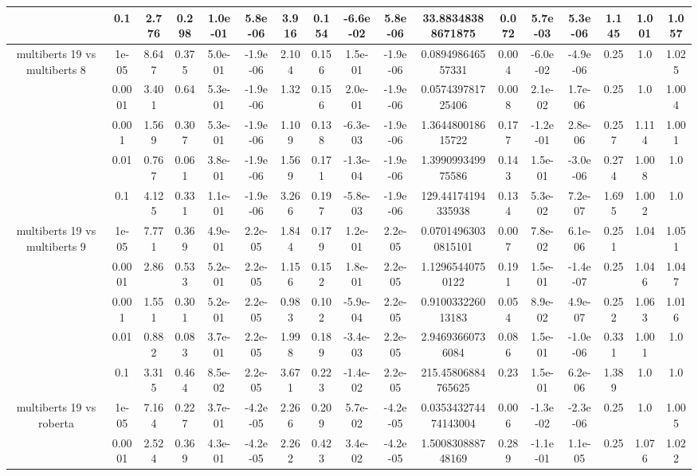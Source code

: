 \begin{tabular}{|c|c|c|c|c|c|c|c|c|c|c|c|c|c|c|c|c|}
 & 0.1 & 2.776 & 0.298 & 1.0e-01 & 5.8e-06 & 3.916 & 0.154 & -6.6e-02 & 5.8e-06 & 33.88348388671875 & 0.072 & 5.7e-03 & 5.3e-06 & 1.145 & 1.001 & 1.057 \\
\hline
\multirow{5}{*}{multiberts 19 vs multiberts 8} & 1e-05 & 8.647 & 0.375 & 5.0e-01 & -1.9e-06 & 2.104 & 0.156 & 1.5e-01 & -1.9e-06 & 0.089498646557331 & 0.004 & -6.0e-02 & -4.9e-06 & 0.25 & 1.0 & 1.025 \\
 & 0.0001 & 3.401 & 0.64 & 5.3e-01 & -1.9e-06 & 1.32 & 0.156 & 2.0e-01 & -1.9e-06 & 0.057439781725406 & 0.008 & 2.1e-02 & 1.7e-06 & 0.25 & 1.0 & 1.004 \\
 & 0.001 & 1.569 & 0.307 & 5.3e-01 & -1.9e-06 & 1.109 & 0.138 & -6.3e-03 & -1.9e-06 & 1.364480018615722 & 0.177 & -1.2e-01 & 2.8e-06 & 0.257 & 1.114 & 1.001 \\
 & 0.01 & 0.767 & 0.061 & 3.8e-01 & -1.9e-06 & 1.569 & 0.171 & -1.3e-04 & -1.9e-06 & 1.399099349975586 & 0.143 & 1.5e-01 & -3.0e-06 & 0.274 & 1.008 & 1.0 \\
 & 0.1 & 4.125 & 0.331 & 1.1e-01 & -1.9e-06 & 3.266 & 0.197 & -5.8e-03 & -1.9e-06 & 129.44174194335938 & 0.134 & 5.3e-02 & 7.2e-07 & 1.695 & 1.002 & 1.0 \\
\hline
\multirow{5}{*}{multiberts 19 vs multiberts 9} & 1e-05 & 7.771 & 0.369 & 4.9e-01 & 2.2e-05 & 1.844 & 0.179 & 1.2e-01 & 2.2e-05 & 0.07014963030815101 & 0.007 & 7.8e-02 & 6.1e-06 & 0.251 & 1.04 & 1.051 \\
 & 0.0001 & 2.86 & 0.533 & 5.2e-01 & 2.2e-05 & 1.156 & 0.152 & 1.8e-01 & 2.2e-05 & 1.12965440750122 & 0.191 & 1.5e-01 & -1.4e-07 & 0.25 & 1.046 & 1.047 \\
 & 0.001 & 1.551 & 0.301 & 5.2e-01 & 2.2e-05 & 0.983 & 0.102 & -5.9e-04 & 2.2e-05 & 0.910033226013183 & 0.054 & 8.9e-02 & 4.9e-07 & 0.252 & 1.063 & 1.016 \\
 & 0.01 & 0.882 & 0.083 & 3.7e-01 & 2.2e-05 & 1.998 & 0.189 & -3.4e-03 & 2.2e-05 & 2.94693660736084 & 0.086 & 1.5e-01 & -1.0e-06 & 0.331 & 1.001 & 1.0 \\
 & 0.1 & 3.315 & 0.464 & 8.5e-02 & 2.2e-05 & 3.671 & 0.223 & -1.4e-02 & 2.2e-05 & 215.45806884765625 & 0.23 & 1.5e-01 & 6.2e-06 & 1.389 & 1.0 & 1.0 \\
\hline
\multirow{5}{*}{multiberts 19 vs roberta } & 1e-05 & 7.164 & 0.227 & 3.7e-01 & -4.2e-05 & 2.266 & 0.209 & 5.7e-02 & -4.2e-05 & 0.035343274474143004 & 0.006 & -1.3e-02 & -2.3e-06 & 0.25 & 1.0 & 1.005 \\
 & 0.0001 & 2.524 & 0.369 & 4.3e-01 & -4.2e-05 & 2.262 & 0.423 & 3.4e-02 & -4.2e-05 & 1.500830888748169 & 0.289 & -1.1e-01 & 1.1e-05 & 0.25 & 1.076 & 1.022 \\

\end{tabular}
